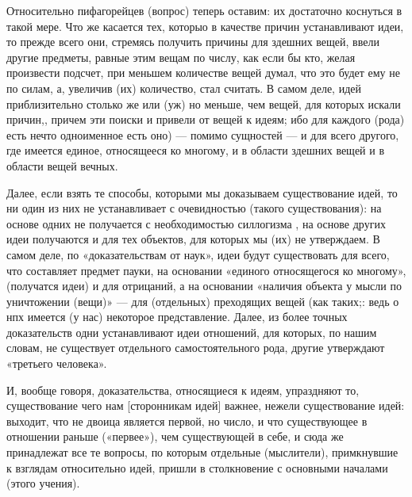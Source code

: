 \documentclass{article}
\begin{document}
Относительно пифагорейцев (вопрос) теперь оставим: их достаточно коснуться в такой мере. Что же касается тех, которыо в качестве причин устанавливают идеи, то прежде всего они, стремясь получить причины для здешних вещей, ввели другие предметы, равные этим вещам по числу, как если бы кто, желая произвести подсчет, при меньшем количестве вещей думал, что это будет ему не по силам, а, увеличив (их) количество, стал считать. В самом деле, идей приблизительно столько же или (уж) но меньше, чем вещей,
\footnotemark[1]
для которых искали причин,, причем эти поиски и привели от вещей к идеям; ибо для каждого (рода) есть нечто одноименное есть оно) --- помимо сущностей --- и для всего другого, где имеется единое, относящееся ко многому, и в области здешних вещей и в области вещей вечных.

Далее, если взять те способы, которыми мы  доказываем существование идей, то ни один из них не устанавливает с очевидностью (такого существования):
\footnotemark[2]
на основе одних не получается с необходимостью силлогизма , на основе других идеи получаются и для тех объектов, для которых мы (их) не утверждаем. В самом деле, по «доказательствам от наук»,
\footnotemark[3]
идеи будут существовать для всего, что составляет предмет пауки, на основании «единого относящегося ко многому»,
\footnotemark[4]
(получатся идеи) и для отрицаний, а на основании «наличия объекта у мысли по уничтожении (вещи)»
\footnotemark[5]
 --- для (отдельных) преходящих вещей (как таких;: ведь о нпх имеется (у нас) некоторое представление. Далее, из более точных доказательств
\footnotemark[6]
одни устанавливают идеи отношений, для которых, по нашим словам, не существует отдельного самостоятельного рода,
\footnotemark[7]
другие утверждают «третьего человека».
\footnotemark[8]


И, вообще говоря, доказательства, относящиеся к идеям, упраздняют то, существование чего нам [сторонникам идей]
\footnotemark[9]
важнее, нежели существование идей: выходит, что не двоица является первой, но число, и что существующее в отношении раньше («первее»), чем существующей в себе, и сюда же принадлежат все те вопросы, по которым отдельные (мыслители), примкнувшие к взглядам относительно идей, пришли в столкновение с основными началами (этого учения).
\end{document}
